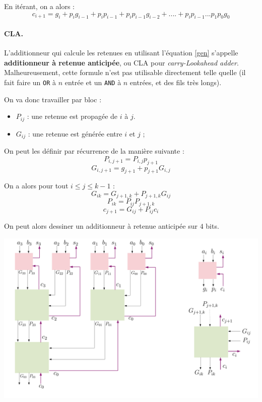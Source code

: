 En itérant, on a alors :
\begin{equation}\label{gen}
c_{i+1}=g_i+p_ig_{i-1} + p_ip_{i-1} + p_ip_{i-1}g_{i-2}+....+p_ip_{i-1}...p_1p_0g_0
\end{equation}

\paragraph{CLA.} L'additionneur qui calcule les retenues en utilisant l'équation \ref{gen} s'appelle \textbf{additionneur à retenue anticipée}, ou CLA pour \textit{carry-Lookahead adder}. Malheureusement, cette formule n'est pas utilisable directement telle quelle (il fait faire un {\tt OR} à $n$ entrée et un {\tt AND} à $n$ entrées, et des fils très longs).

On va donc travailler par bloc :
\begin{itemize}
\item $P_{ij}$ : une retenue est propagée de $i$ à $j$.
\item $G_{ij}$ : une retenue est générée entre $i$ et $j$ ;
\end{itemize}

On peut les définir par récurrence de la manière suivante :
\begin{equation}
P_{i,j+1} = P_{i,j}p_{j+1}
\end{equation}
\begin{equation}
G_{i,j+1} = g_{j+1}+ p_{j+1}G_{i,j}
\end{equation}

On a alors pour tout $i\leq j\leq k-1$ :
\begin{equation}
G_{ik} = G_{j+1,k}+P_{j+1,k}G_{ij}
\end{equation}
\begin{equation}
P_{ik} = P_{ij}P_{j+1,k}
\end{equation}
\begin{equation}
c_{j+1} = G_{ij}+P_{ij}c_i
\end{equation}

On peut alors dessiner un additionneur à retenue anticipée sur $4$ bits.

\noindent\includegraphics[scale=0.5]{Developpements/Additionneur à retenue anticipée/schéma.pdf} 


